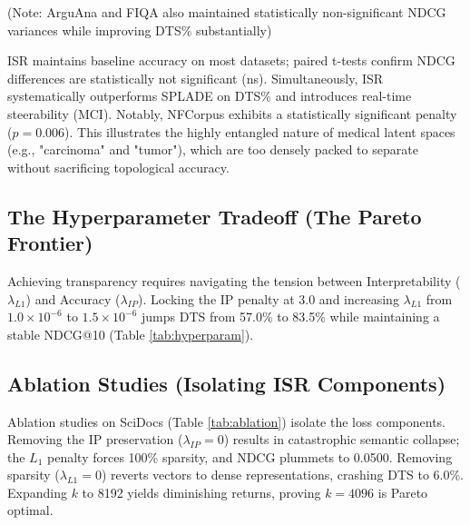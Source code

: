 \documentclass[sigconf,authordraft]{acmart}
\begin{document}
(Note: ArguAna and FIQA also maintained statistically non-significant NDCG variances while improving DTS\% substantially)

ISR maintains baseline accuracy on most datasets; paired t-tests confirm NDCG differences are statistically not significant (ns). Simultaneously, ISR systematically outperforms SPLADE on DTS\% and introduces real-time steerability (MCI). Notably, NFCorpus exhibits a statistically significant penalty ($p=0.006$). This illustrates the highly entangled nature of medical latent spaces (e.g., "carcinoma" and "tumor"), which are too densely packed to separate without sacrificing topological accuracy.

\subsection{The Hyperparameter Tradeoff (The Pareto Frontier)}
Achieving transparency requires navigating the tension between Interpretability ($\lambda_{L1}$) and Accuracy ($\lambda_{IP}$). Locking the IP penalty at 3.0 and increasing $\lambda_{L1}$ from $1.0\times 10^{-6}$ to $1.5\times 10^{-6}$ jumps DTS from 57.0\% to 83.5\% while maintaining a stable NDCG@10 (Table \ref{tab:hyperparam}).

\begin{table}[htbp]
\centering
\caption{Hyperparameter Tradeoff Analysis (SciDocs)}
\label{tab:hyperparam}
\end{table}

\subsection{Ablation Studies (Isolating ISR Components)}
Ablation studies on SciDocs (Table \ref{tab:ablation}) isolate the loss components. Removing the IP preservation ($\lambda_{IP}=0$) results in catastrophic semantic collapse; the $L_1$ penalty forces 100\% sparsity, and NDCG plummets to 0.0500. Removing sparsity ($\lambda_{L1}=0$) reverts vectors to dense representations, crashing DTS to 6.0\%. Expanding $k$ to 8192 yields diminishing returns, proving $k=4096$ is Pareto optimal.
\end{document}
